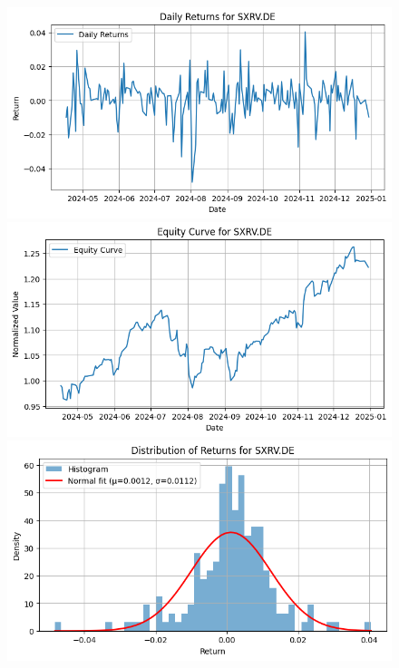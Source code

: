 \documentclass{article}%
\begin{document}
\begin{figure}[htbp]%
\begin{minipage}{0.31\textwidth}%
\includegraphics[width=\linewidth]{ticker_images/SXRV.DE_daily_returns.png}%
\end{minipage}%
\begin{minipage}{0.31\textwidth}%
\includegraphics[width=\linewidth]{ticker_images/SXRV.DE_equity_curve.png}%
\end{minipage}%
\begin{minipage}{0.31\textwidth}%
\includegraphics[width=\linewidth]{ticker_images/SXRV.DE_return_distribution.png}%
\end{minipage}%
\end{figure}
\end{document}

